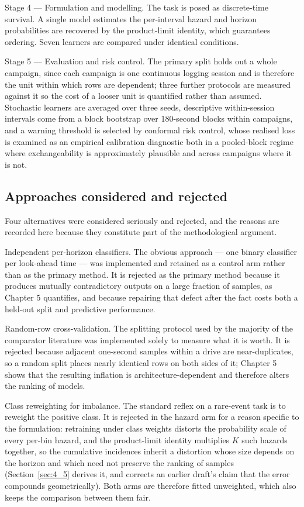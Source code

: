 Stage 4 --- Formulation and modelling. The task is posed as discrete-time survival. A single model estimates the per-interval hazard and horizon probabilities are recovered by the product-limit identity, which guarantees ordering. Seven learners are compared under identical conditions.

Stage 5 --- Evaluation and risk control. The primary split holds out a whole campaign, since each campaign is one continuous logging session and is therefore the unit within which rows are dependent; three further protocols are measured against it so the cost of a looser unit is quantified rather than assumed. Stochastic learners are averaged over three seeds, descriptive within-session intervals come from a block bootstrap over 180-second blocks within campaigns, and a warning threshold is selected by conformal risk control, whose realised loss is examined as an empirical calibration diagnostic both in a pooled-block regime where exchangeability is approximately plausible and across campaigns where it is not.


\subsection{Approaches considered and rejected}
\label{sec:2_10_1}

Four alternatives were considered seriously and rejected, and the reasons are recorded here because they constitute part of the methodological argument.

Independent per-horizon classifiers. The obvious approach --- one binary classifier per look-ahead time --- was implemented and retained as a control arm rather than as the primary method. It is rejected as the primary method because it produces mutually contradictory outputs on a large fraction of samples, as Chapter 5 quantifies, and because repairing that defect after the fact costs both a held-out split and predictive performance.

Random-row cross-validation. The splitting protocol used by the majority of the comparator literature was implemented solely to measure what it is worth. It is rejected because adjacent one-second samples within a drive are near-duplicates, so a random split places nearly identical rows on both sides of it; Chapter 5 shows that the resulting inflation is architecture-dependent and therefore alters the ranking of models.

Class reweighting for imbalance. The standard reflex on a rare-event task is to reweight the positive class. It is rejected in the hazard arm for a reason specific to the formulation: retraining under class weights distorts the probability scale of every per-bin hazard, and the product-limit identity multiplies $K$ such hazards together, so the cumulative incidences inherit a distortion whose size depends on the horizon and which need not preserve the ranking of samples (Section~\ref{sec:4_5} derives it, and corrects an earlier draft's claim that the error compounds geometrically). Both arms are therefore fitted unweighted, which also keeps the comparison between them fair.

